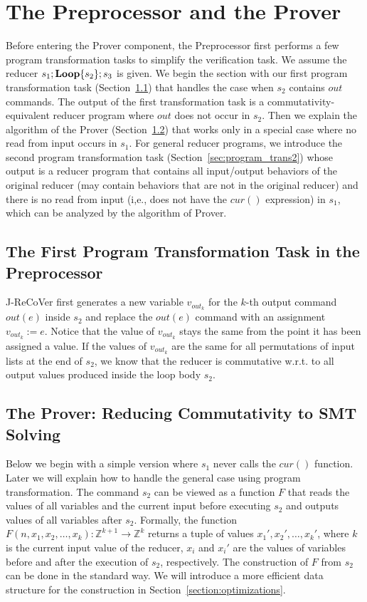 \documentclass{llncs}
\newcommand{\cur}{cur()}
\newcommand{\rloop}{
	\ifmmode 
	\mathbf{Loop}
	\else
	\textbf{Loop}
	\fi}
\newcommand{\Z}{\mathbb{Z}}
\begin{document}
\section{The Preprocessor and the Prover}
\label{sec:preprocessor_prover}

Before entering the Prover component, the Preprocessor first performs a few program transformation tasks to simplify the verification task. 
We assume the reducer $s_1;\rloop\{s_2\};s_3$ is given. We begin the section with our first program transformation task (Section~\ref{sec:program_trans1}) that handles the case when $s_2$ contains $out$ commands. The output of the first transformation task is a commutativity-equivalent reducer program where $out$ does not occur in $s_2$.  Then we explain the algorithm of the Prover (Section~\ref{sec:prover}) that works only in a special case where no read from input occurs in $s_1$. For general reducer programs, we introduce the second program transformation task (Section~\ref{sec:program_trans2}) whose output is a reducer program that contains all input/output behaviors of the original reducer (may contain behaviors that are not in the original reducer) and there is no read from input (i,e., does not have the $\cur$ expression) in $s_1$, which can be analyzed by the algorithm of Prover.  

\subsection{The First Program Transformation Task in the Preprocessor}
\label{sec:program_trans1}
J-ReCoVer  first generates a new variable $v_{out_k}$ for the $k$-th output command $out(e)$ inside $s_2$ and replace the $out(e)$ command with an assignment $v_{out_k}:=e$. 
Notice that the value of $v_{out_k}$ stays the same from the point it has been assigned a value. 
If the values of $v_{out_k}$ are the same for all permutations of input lists at the end of $s_2$, we know that the reducer is commutative w.r.t. to all output values produced inside the loop body $s_2$.

\subsection{The Prover: Reducing Commutativity to SMT Solving}
\label{sec:prover}
Below we begin with a simple version where $s_1$ never calls the $\cur$ function. Later we will explain how to handle the general case using program transformation. The command $s_2$ can be viewed as a function $F$ that reads the values of all variables and the current input before executing $s_2$ and outputs values of all variables after $s_2$. Formally, the function $F(n,x_1,x_2,\ldots,x_k): \Z^{k+1} \rightarrow \Z^k$ returns a tuple of values $x_1',x_2',\ldots,x_k'$, where $k$ is the current input value of the reducer, $x_i$ and $x_i'$ are the values of variables before and after the execution of $s_2$, respectively. The construction of $F$ from $s_2$ can be done in the standard way. We will introduce a more efficient data structure for the construction in Section~\ref{section:optimizations}.
\end{document}
